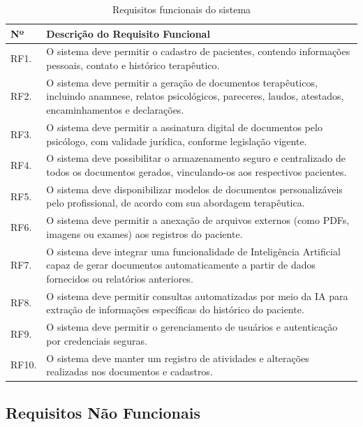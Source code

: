 \begin{table}[H]
\centering
\caption{Requisitos funcionais do sistema}
\begin{tabular}{@{}lp{13cm}@{}}
\toprule
\rowcolor[HTML]{EFEFEF} 
\textbf{Nº} & \textbf{Descrição do Requisito Funcional} \\ \midrule
RF1.  & O sistema deve permitir o cadastro de pacientes, contendo informações pessoais, contato e histórico terapêutico. \\
RF2.  & O sistema deve permitir a geração de documentos terapêuticos, incluindo anamnese, relatos psicológicos, pareceres, laudos, atestados, encaminhamentos e declarações. \\
RF3.  & O sistema deve permitir a assinatura digital de documentos pelo psicólogo, com validade jurídica, conforme legislação vigente. \\
RF4.  & O sistema deve possibilitar o armazenamento seguro e centralizado de todos os documentos gerados, vinculando-os aos respectivos pacientes. \\
RF5.  & O sistema deve disponibilizar modelos de documentos personalizáveis pelo profissional, de acordo com sua abordagem terapêutica. \\
RF6.  & O sistema deve permitir a anexação de arquivos externos (como PDFs, imagens ou exames) aos registros do paciente. \\
RF7.  & O sistema deve integrar uma funcionalidade de Inteligência Artificial capaz de gerar documentos automaticamente a partir de dados fornecidos ou relatórios anteriores. \\
RF8.  & O sistema deve permitir consultas automatizadas por meio da IA para extração de informações específicas do histórico do paciente. \\
RF9.  & O sistema deve permitir o gerenciamento de usuários e autenticação por credenciais seguras. \\
RF10. & O sistema deve manter um registro de atividades e alterações realizadas nos documentos e cadastros. \\
\bottomrule
\end{tabular}
\label{tab:req-funcionais}
\end{table}

\subsection{Requisitos Não Funcionais}

